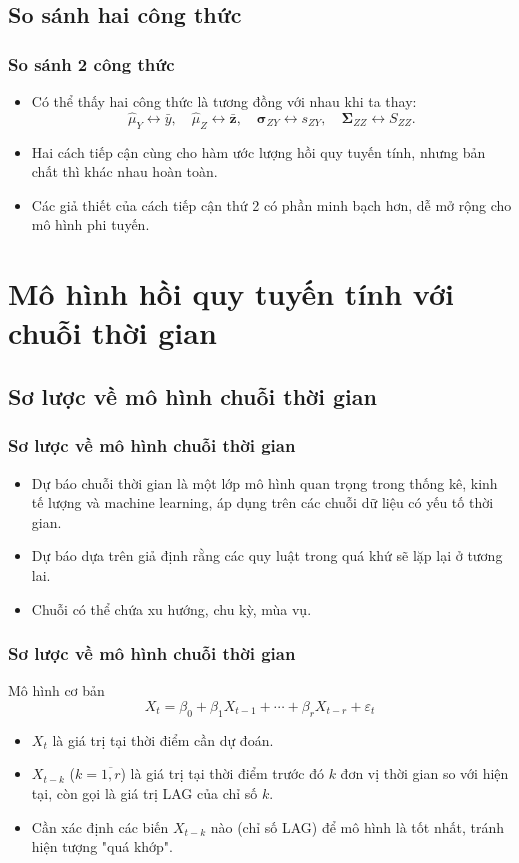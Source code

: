 \subsection{So sánh hai công thức}
\begin{frame}
\frametitle{So sánh 2 công thức}
\begin{itemize}
\item Có thể thấy hai công thức là tương đồng với nhau khi ta thay:
\[\hat{\mu}_Y\leftrightarrow \bar{y},\quad \hat{\mu}_Z\leftrightarrow \bar{\bm{z}},\quad \bm{\sigma}_{ZY}\leftrightarrow s_{ZY},\quad \bm{\Sigma}_{ZZ}\leftrightarrow S_{ZZ}.\]
\item Hai cách tiếp cận cùng cho hàm ước lượng hồi quy tuyến tính, nhưng bản chất thì khác nhau hoàn toàn.
\item Các giả thiết của cách tiếp cận thứ 2 có phần minh bạch hơn, dễ mở rộng cho mô hình phi tuyến.
\end{itemize}
\end{frame}
\section{Mô hình hồi quy tuyến tính với chuỗi thời gian}
\subsection{Sơ lược về mô hình chuỗi thời gian}
\begin{frame}
\frametitle{Sơ lược về mô hình chuỗi thời gian}
\begin{itemize}
\item	Dự báo chuỗi thời gian là một lớp mô hình quan trọng trong thống kê, kinh tế lượng và machine learning, áp dụng trên các chuỗi dữ liệu có yếu tố thời gian.
\item Dự báo dựa trên giả định rằng các quy luật trong quá khứ sẽ lặp lại ở tương lai.
\item Chuỗi có thể chứa xu hướng, chu kỳ, mùa vụ.
\end{itemize}
\end{frame}


\begin{frame}
\frametitle{Sơ lược về mô hình chuỗi thời gian}
\begin{block}{Mô hình cơ bản}
\vspace{0.25cm}
\begin{equation}
X_t = \beta_0 + \beta_1X_{t-1} + \cdots + \beta_rX_{t-r} + \varepsilon_t \label{eq:101}
\end{equation}
\begin{itemize}
    \item $X_{t}$ là giá trị tại thời điểm cần dự đoán.
\item $X_{t-k}$ ($k=\overline{1,r}$) là giá trị tại thời điểm trước đó $k$ đơn vị thời gian so với hiện tại, còn gọi là giá trị LAG của chỉ số $k$.
\item Cần xác định các biến $X_{t-k}$ nào (chỉ số LAG) để mô hình là tốt nhất, tránh hiện tượng "quá khớp".
\end{itemize}
\end{block}
\end{frame}
